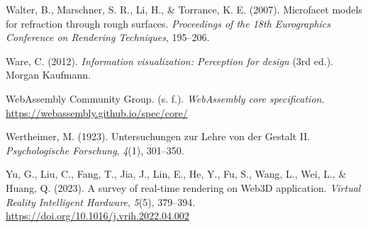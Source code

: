 \begin{list}{}
\item Walter, B., Marschner, S. R., Li, H., \& Torrance, K. E. (2007). Microfacet models for refraction through rough surfaces. \textit{Proceedings of the 18th Eurographics Conference on Rendering Techniques}, 195--206.

\item Ware, C. (2012). \textit{Information visualization: Perception for design} (3rd ed.). Morgan Kaufmann.

\item WebAssembly Community Group. (s. f.). \textit{WebAssembly core specification}. \url{https://webassembly.github.io/spec/core/}

\item Wertheimer, M. (1923). Untersuchungen zur Lehre von der Gestalt II. \textit{Psychologische Forschung}, \textit{4}(1), 301--350.

\item Yu, G., Liu, C., Fang, T., Jia, J., Lin, E., He, Y., Fu, S., Wang, L., Wei, L., \& Huang, Q. (2023). A survey of real-time rendering on Web3D application. \textit{Virtual Reality Intelligent Hardware}, \textit{5}(5), 379--394. \url{https://doi.org/10.1016/j.vrih.2022.04.002}

\end{list}
